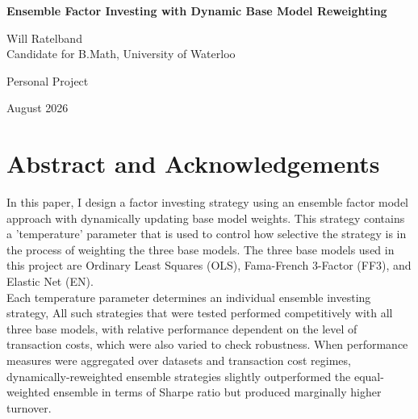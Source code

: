 \documentclass{article}
\begin{document}

\begin{titlepage}
    \centering

    \vspace*{2cm}

    {\LARGE\bfseries Ensemble Factor Investing with Dynamic Base Model Reweighting\par}

    \vspace{2cm}

    {\large
    Will Ratelband\\
    Candidate for B.Math, University of Waterloo\\
    \par}

    \vspace{1.5cm}

    {\large
    Personal Project\\
    \par}

    \vfill

    {\large
    August 2026
    \par}

    \vspace{1cm}

\end{titlepage}

\break

\tableofcontents

\newpage

\section{Abstract and Acknowledgements}

In this paper, I design a factor investing strategy using an ensemble factor model approach with dynamically updating base model weights. This strategy contains a 'temperature' parameter that is used to control how selective the strategy is in the process of weighting the three base models. The three base models used in this project are Ordinary Least Squares (OLS), Fama-French 3-Factor (FF3), and Elastic Net (EN). \\

Each temperature parameter determines an individual ensemble investing strategy, All such strategies that were tested performed competitively with all three base models, with relative performance dependent on the level of transaction costs, which were also varied to check robustness. When performance measures were aggregated over datasets and transaction cost regimes, dynamically-reweighted ensemble strategies slightly outperformed the equal-weighted ensemble in terms of Sharpe ratio but produced marginally higher turnover.\\
\end{document}
